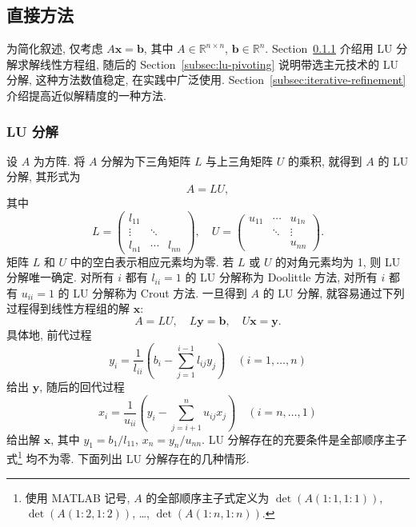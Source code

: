 \subsection{{直接方法}}\label{sec:direct-methods}
{为简化叙述, 仅考虑 $A\bm x=\bm b$, 其中 $A\in\mathbb R^{n\times n}$, $\bm b\in\mathbb R^n$. Section~\ref{subsec:lu-decomposition} 介绍用 LU 分解求解线性方程组, 随后的 Section~\ref{subsec:lu-pivoting} 说明带选主元技术的 LU 分解, 这种方法数值稳定, 在实践中广泛使用. Section~\ref{subsec:iterative-refinement} 介绍提高近似解精度的一种方法.}
\subsubsection{{LU 分解}}\label{subsec:lu-decomposition}
{设 $A$ 为方阵. 将 $A$ 分解为下三角矩阵 $L$ 与上三角矩阵 $U$ 的乘积, 就得到 $A$ 的 LU 分解, 其形式为}
\begin{equation}\label{eq:lu-factorization}A=LU,\end{equation}
{其中}
\[
L=\begin{pmatrix}l_{11}&&\\\vdots&\ddots&\\l_{n1}&\cdots&l_{nn}\end{pmatrix},\quad
U=\begin{pmatrix}u_{11}&\cdots&u_{1n}\\&\ddots&\vdots\\&&u_{nn}\end{pmatrix}.
\]
{矩阵 $L$ 和 $U$ 中的空白表示相应元素均为零.}
{若 $L$ 或 $U$ 的对角元素均为 1, 则 LU 分解唯一确定. 对所有 $i$ 都有 $l_{ii}=1$ 的 LU 分解称为 Doolittle 方法, 对所有 $i$ 都有 $u_{ii}=1$ 的 LU 分解称为 Crout 方法. 一旦得到 $A$ 的 LU 分解, 就容易通过下列过程得到线性方程组的解 $\bm x$:}
\begin{equation}\label{eq:lu-triangular-solves}A=LU,\quad L\bm y=\bm b,\quad U\bm x=\bm y.\end{equation}
{具体地, 前代过程}
\[
y_i=\frac1{l_{ii}}\left(b_i-\sum_{j=1}^{i-1}l_{ij}y_j\right)\quad(i=1,\ldots,n)
\]
{给出 $\bm y$, 随后的回代过程}
\[
x_i=\frac1{u_{ii}}\left(y_i-\sum_{j=i+1}^n u_{ij}x_j\right)\quad(i=n,\ldots,1)
\]
{给出解 $\bm x$, 其中 $y_1=b_1/l_{11}$, $x_n=y_n/u_{nn}$.}
{LU 分解存在的充要条件是全部顺序主子式\footnote{使用 MATLAB 记号, $A$ 的全部顺序主子式定义为 $\det(A(1:1,1:1))$, $\det(A(1:2,1:2))$, \ldots, $\det(A(1:n,1:n))$.} 均不为零. 下面列出 LU 分解存在的几种情形.}

